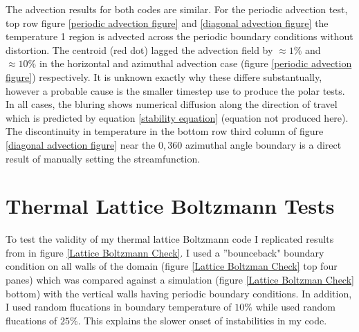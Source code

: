 \documentclass{article}
\begin{document}
\noindent The advection results for both codes are similar. For the periodic advection test, top row figure \ref{periodic advection figure} and \ref{diagonal advection figure} the temperature 1 region is advected across the periodic boundary conditions without distortion. The centroid (red dot) lagged the advection field by $\approx 1 \%$ and $\approx 10 \%$ in the horizontal and azimuthal advection case (figure \ref{periodic advection figure}) respectively. It is unknown exactly why these differe substantually, however a probable cause is the smaller timestep use to produce the polar tests. In all cases, the bluring shows numerical diffusion along the direction of travel which is predicted by equation \ref{stability equation} (equation not produced here). The discontinuity in temperature in the bottom row third column of figure \ref{diagonal advection figure} near the $0, 360$ azimuthal angle boundary is a direct result of manually setting the streamfunction.

\section*{Thermal Lattice Boltzmann Tests}
To test the validity of my thermal lattice Boltzmann code I replicated results from \cite{mora2017simulation} in figure \ref{Lattice Boltzmann 
Check}. I used a ''bounceback" boundary condition on all walls of the domain (figure \ref{Lattice Boltzman Check} top four panes) which was compared against a simulation (figure \ref{Lattice Boltzman Check} bottom) with the vertical walls having periodic boundary conditions. In addition, I used random flucations in boundary temperature of $10 \%$ while \cite{mora2017simulation} used random flucations of $25 \%$. This explains the slower onset of instabilities in my code.
\end{document}
